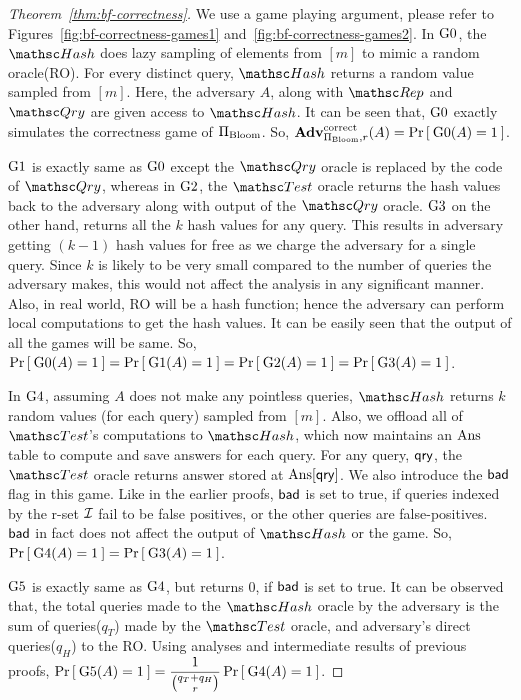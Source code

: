 \begin{proof}[Theorem~\ref{thm:bf-correctness}]
We use a game playing argument, please refer to Figures~\ref{fig:bf-correctness-games1} and~\ref{fig:bf-correctness-games2}. In $\text{G0}$, the $\Hash$ does lazy sampling of elements from $[m]$ to mimic a random oracle(RO). For every distinct query, $\Hash$ returns a random value sampled from $[m]$. Here, the adversary $A$, along with $\Rep$ and $\Qry$ are given access to $\Hash$. It can be seen that, $\text{G0}$ exactly simulates the correctness game of $\Pi_{\mathrm{Bloom}}$. So, $\mathrm{\mathbf{Adv}}^{\mathrm{correct}}_{\Pi_{\mathrm{Bloom}},r}(A) = \Pr\left[\: \text{G0}(A) = 1 \:\right]$.

$\text{G1}$ is exactly same as $\text{G0}$ except the $\Qry$ oracle is replaced by the code of $\Qry$, whereas in $\text{G2}$, the $\Test$ oracle returns the hash values back to the adversary along with output of the $\Qry$ oracle. $\text{G3}$ on the other hand, returns all the $k$ hash values for any query. This results in adversary getting $(k-1)$ hash values for free as we charge the adversary for a single query. Since $k$ is likely to be very small compared to the number of queries the adversary makes, this would not affect the analysis in any significant manner. Also, in real world, RO will be a hash function; hence the adversary can perform local computations to get the hash values. It can be easily seen that the output of all the games will be same. So, $\Pr\left[\: \text{G0}(A) = 1 \:\right] = \Pr\left[\: \text{G1}(A) = 1 \:\right] = \Pr\left[\: \text{G2}(A) = 1 \:\right] = \Pr\left[\: \text{G3}(A) = 1 \:\right]$. 

In $\text{G4}$, assuming $A$ does not make any pointless queries, $\Hash$ returns $k$ random values (for each query) sampled from $[m]$. Also, we offload all of $\Test$'s computations to $\Hash$, which now maintains an $\mathrm{Ans}$ table to compute and save answers for each query.  For any query, $\mathsf{qry}$, the $\Test$ oracle returns answer stored at $\mathrm{Ans}[\mathsf{qry}]$. We also introduce the $\mathsf{bad}$ flag in this game. Like in the earlier proofs,  $\mathsf{bad}$ is set to true, if queries indexed by the r-set ${\cal I}$ fail to be false positives, or the other queries are false-positives. $\mathsf{bad}$ in fact does not affect the output of $\Hash$ or the game. So, $\Pr\left[\: \text{G4}(A) = 1 \:\right] = \Pr\left[\: \text{G3}(A) = 1 \:\right]$. 

$\text{G5}$ is exactly same as $\text{G4}$, but returns 0, if $\mathsf{bad}$ is set to true. It can be observed that, the total queries made to the $\Hash$ oracle by the adversary is the sum of queries($q_T$) made by the $\Test$ oracle, and adversary's direct queries($q_H$) to the RO. Using analyses and intermediate results of previous proofs, $\Pr\left[\: \text{G5}(A)=1 \:\right] = \dfrac{1}{\binom{q_T + q_H}{r}}\Pr\left[\: \text{G4}(A)=1 \:\right]$.


\end{proof}
